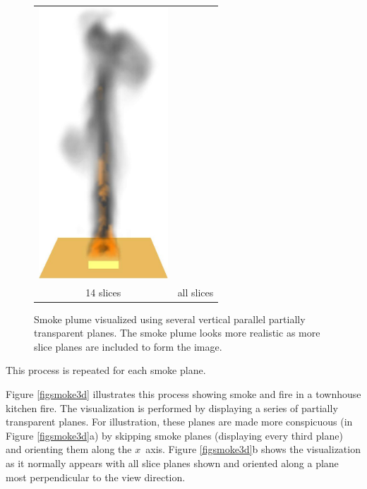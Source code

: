 {\begin{figure}[\figoptions]
\begin{center}
\begin{tabular}{cc}
\includegraphics[height=4.0in]{FIGURES/splume_11_27}\\
14 slices&all slices
\end{tabular}
\end{center}
\caption [Smoke plume visualized using several vertical parallel
partially transparent planes.] {Smoke plume visualized using
several vertical parallel partially transparent planes. The smoke
plume looks more realistic as more slice planes
are included to form the image. } \label{figplume}
\end{figure}

\noindent This process is repeated for each smoke plane.

Figure \ref{figsmoke3d} illustrates this process showing smoke and
fire in a townhouse kitchen fire. The visualization is performed
by displaying a series of partially transparent planes. For
illustration, these planes are made more conspicuous (in Figure
\ref{figsmoke3d}a) by skipping smoke planes (displaying every
third plane) and orienting them along the $x$~axis. Figure
\ref{figsmoke3d}b shows the visualization as it normally appears
with all slice planes shown and oriented along a plane most
perpendicular to the view direction.

}
